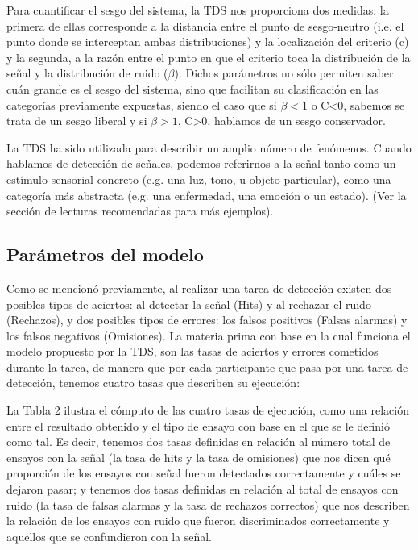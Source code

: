 \begin{itemize}
\begin{itemize}
Para cuantificar el sesgo del sistema, la TDS nos proporciona dos medidas: la primera de ellas corresponde a la distancia entre el punto de sesgo-neutro (i.e. el punto donde se interceptan ambas distribuciones) y la localización del criterio (c) y la segunda, a la razón entre el punto en que el criterio toca la distribución de la señal y la distribución de ruido ($\beta$). Dichos parámetros no sólo permiten saber cuán grande es el sesgo del sistema, sino que facilitan su clasificación en las categorías previamente expuestas, siendo el caso que si $\beta<1$ o C<0, sabemos se trata de un sesgo liberal y si $\beta>1$, C>0, hablamos de un sesgo conservador.\\
     \end{itemize}
\end{itemize}



La TDS ha sido utilizada para describir un amplio número de fenómenos. Cuando hablamos de detección de señales, podemos referirnos a la señal tanto como un estímulo sensorial concreto (e.g. una luz, tono, u objeto particular), como una categoría más abstracta (e.g. una enfermedad, una emoción o un estado).  (Ver la sección de lecturas recomendadas para más ejemplos).\\


\subsection{Parámetros del modelo}

Como se mencionó previamente, al realizar una tarea de detección existen dos posibles tipos de aciertos: al detectar la señal (Hits) y al rechazar el ruido (Rechazos), y dos posibles tipos de errores: los falsos positivos (Falsas alarmas) y los falsos negativos (Omisiones). La materia prima con base en la cual funciona el modelo propuesto por la TDS, son las tasas de aciertos y errores cometidos durante la tarea, de manera que por cada participante que pasa por una tarea de detección, tenemos cuatro tasas que describen su ejecución:

La Tabla 2 ilustra el cómputo de las cuatro tasas de ejecución, como una relación entre el resultado obtenido y el tipo de ensayo con base en el que se le definió como tal. Es decir, tenemos dos tasas definidas en relación al número total de ensayos con la señal (la tasa de hits y la tasa de omisiones) que nos dicen qué proporción de los ensayos con señal fueron detectados correctamente y cuáles se dejaron pasar; y tenemos dos tasas definidas en relación al total de ensayos con ruido (la tasa de falsas alarmas y la tasa de rechazos correctos) que nos describen la relación de los ensayos con ruido que fueron discriminados correctamente y aquellos que se confundieron con la señal.

